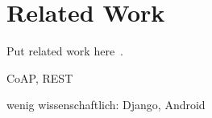 
\chapter{Related Work}
\label{sec:relatedwork}

Put related work here~\cite{mattern2010ict}.

CoAP, REST

wenig wissenschaftlich: Django, Android